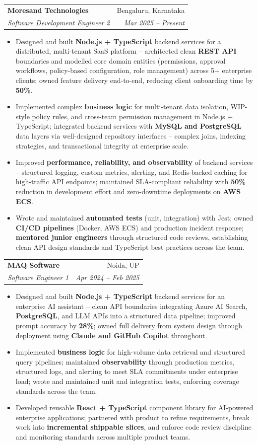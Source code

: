 \documentclass[a4paper,20pt]{article}
\makeatletter
\newcommand{\resumeSubheading}[4]{\vspace{-1pt}\item\begin{tabular*}{0.97\textwidth}{l@{\extracolsep{\fill}}r}\textbf{#1} & #2 \\\textit{#3} & \textit{#4} \\\end{tabular*}\vspace{-5pt}}
\newcommand{\resumeItemListStart}{\begin{itemize}}
\newcommand{\resumeItemListEnd}{\end{itemize}\vspace{-5pt}}
\makeatother
\begin{document}
    \resumeSubheading
      {Moresand Technologies}{Bengaluru, Karnataka}
      {Software Development Engineer 2}{Mar 2025 -- Present}
      \resumeItemListStart
        \item\small{Designed and built \textbf{Node.js + TypeScript} backend services for a distributed, multi-tenant SaaS platform -- architected clean \textbf{REST API} boundaries and modelled core domain entities (permissions, approval workflows, policy-based configuration, role management) across 5+ enterprise clients; owned feature delivery end-to-end, reducing client onboarding time by \textbf{50\%}.}
        \item\small{Implemented complex \textbf{business logic} for multi-tenant data isolation, WIP-style policy rules, and cross-team permission management in Node.js + TypeScript; integrated backend services with \textbf{MySQL and PostgreSQL} data layers via well-designed repository interfaces -- complex joins, indexing strategies, and transactional integrity at enterprise scale.}
        \item\small{Improved \textbf{performance, reliability, and observability} of backend services -- structured logging, custom metrics, alerting, and Redis-backed caching for high-traffic API endpoints; maintained SLA-compliant reliability with \textbf{50\%} reduction in development effort and zero-downtime deployments on \textbf{AWS ECS}.}
        \item\small{Wrote and maintained \textbf{automated tests} (unit, integration) with Jest; owned \textbf{CI/CD pipelines} (Docker, AWS ECS) and production incident response; \textbf{mentored junior engineers} through structured code reviews, establishing clean API design standards and TypeScript best practices across the team.}
      \resumeItemListEnd

    \resumeSubheading
      {MAQ Software}{Noida, UP}
      {Software Engineer 1}{Apr 2024 -- Feb 2025}
      \resumeItemListStart
        \item\small{Designed and built \textbf{Node.js + TypeScript} backend services for an enterprise AI assistant -- clean API boundaries integrating Azure AI Search, \textbf{PostgreSQL}, and LLM APIs into a structured data pipeline; improved prompt accuracy by \textbf{28\%}; owned full delivery from system design through deployment using \textbf{Claude and GitHub Copilot} throughout.}
        \item\small{Implemented \textbf{business logic} for high-volume data retrieval and structured query pipelines; maintained \textbf{observability} through production metrics, structured logs, and alerting to meet SLA commitments under enterprise load; wrote and maintained unit and integration tests, enforcing coverage standards across the team.}
        \item\small{Developed reusable \textbf{React + TypeScript} component library for AI-powered enterprise applications; partnered with product to refine requirements, break work into \textbf{incremental shippable slices}, and enforce code review discipline and monitoring standards across multiple product teams.}
      \resumeItemListEnd
\end{document}

